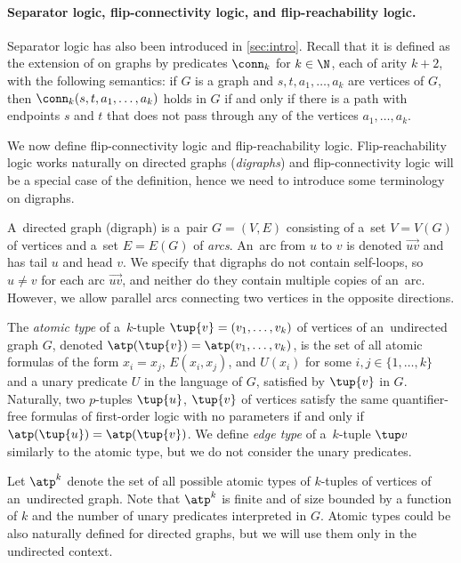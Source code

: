 \paragraph*{Separator logic, flip-connectivity logic, and flip-reachability logic.}
Separator logic has also been introduced in \cref{sec:intro}. Recall that it is defined as the extension of \fo on graphs by predicates $\conn_k$ for $k\in \N$, each of arity $k+2$, with the following semantics: if $G$ is a graph and $s,t,a_1,\ldots,a_k$ are vertices of $G$, then $\conn_k(s,t,a_1,\ldots,a_k)$ holds in $G$ if and only if there is a path with endpoints $s$ and $t$ that does not pass through any of the vertices $a_1,\ldots,a_k$.

We now define flip-connectivity logic and flip-reachability logic. Flip-reachability logic works naturally on directed graphs ({\em{digraphs}}) and flip-connectivity logic will be a special case of the definition, hence we need to introduce some terminology on digraphs.

A~directed graph (digraph) is a~pair $G=(V, E)$ consisting of a~set $V=V(G)$ of vertices and a~set $E=E(G)$ of \emph{arcs}.
An~arc from $u$ to $v$ is denoted $\vec{uv}$ and has tail $u$ and head $v$.
We specify that digraphs do not contain self-loops, so $u \neq v$ for each arc $\vec{uv}$, and neither do they contain multiple copies of an~arc.
However, we allow parallel arcs connecting two vertices in the opposite directions.

The \emph{atomic type} of a~$k$-tuple $\tup{v} = (v_1, \ldots, v_k)$ of vertices of an~undirected graph $G$, denoted $\atp(\tup{v}) = \atp(v_1, \ldots, v_k)$, is the set of all atomic formulas of the form $x_i = x_j$, $E(x_i, x_j)$, and $U(x_i)$ for some $i,j\in \{1,\ldots,k\}$ and a unary predicate $U$ in the language of $G$, satisfied by $\tup{v}$ in $G$.
Naturally, two $p$-tuples $\tup{u}$, $\tup{v}$ of vertices satisfy the same quantifier-free formulas of first-order logic with no parameters if and only if $\atp(\tup{u}) = \atp(\tup{v})$.
We define \emph{edge type} of a~$k$-tuple $\tup v$ similarly to the atomic type, but we do not consider the unary predicates.

Let $\atp^k$ denote the set of all possible atomic types of $k$-tuples of vertices of an~undirected graph. Note that $\atp^k$ is finite and of size bounded by a function of $k$ and the number of unary predicates interpreted in $G$. Atomic types could be also naturally defined for directed graphs, but we will use them only in the undirected context.

